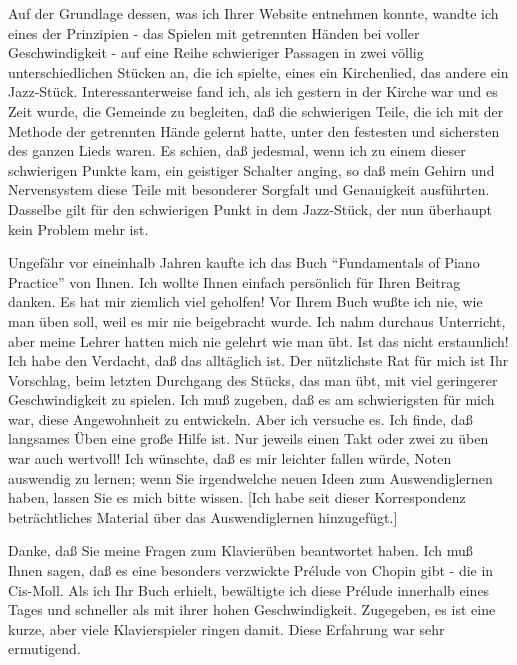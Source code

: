 \item \label{testimonials12}
Auf der Grundlage dessen, was ich Ihrer Website entnehmen konnte, wandte ich eines der Prinzipien - das Spielen mit getrennten Händen bei voller Geschwindigkeit - auf eine Reihe schwieriger Passagen in zwei völlig unterschiedlichen Stücken an, die ich spielte, eines ein Kirchenlied, das andere ein Jazz-Stück.
Interessanterweise fand ich, als ich gestern in der Kirche war und es Zeit wurde, die Gemeinde zu begleiten, daß die schwierigen Teile, die ich mit der Methode der getrennten Hände gelernt hatte, unter den festesten und sichersten des ganzen Lieds waren.
Es schien, daß jedesmal, wenn ich zu einem dieser schwierigen Punkte kam, ein geistiger Schalter anging, so daß mein Gehirn und Nervensystem diese Teile mit besonderer Sorgfalt und Genauigkeit ausführten.
Dasselbe gilt für den schwierigen Punkt in dem Jazz-Stück, der nun überhaupt kein Problem mehr ist.


\item \label{testimonials13}
Ungefähr vor eineinhalb Jahren kaufte ich das Buch \enquote{Fundamentals of Piano Practice} von Ihnen.
Ich wollte Ihnen einfach persönlich für Ihren Beitrag danken.
Es hat mir ziemlich viel geholfen!
Vor Ihrem Buch wußte ich nie, wie man üben soll, weil es mir nie beigebracht wurde.
Ich nahm durchaus Unterricht, aber meine Lehrer hatten mich nie gelehrt wie man übt.
Ist das nicht erstaunlich!
Ich habe den Verdacht, daß das alltäglich ist.
Der nützlichste Rat für mich ist Ihr Vorschlag, beim letzten Durchgang des Stücks, das man übt, mit viel geringerer Geschwindigkeit zu spielen.
Ich muß zugeben, daß es am schwierigsten für mich war, diese Angewohnheit zu entwickeln.
Aber ich versuche es.
Ich finde, daß langsames Üben eine große Hilfe ist.
Nur jeweils einen Takt oder zwei zu üben war auch wertvoll!
Ich wünschte, daß es mir leichter fallen würde, Noten auswendig zu lernen; wenn Sie irgendwelche neuen Ideen zum Auswendiglernen haben, lassen Sie es mich bitte wissen.
[Ich habe seit dieser Korrespondenz beträchtliches Material über das Auswendiglernen hinzugefügt.]


\item \label{testimonials14}
Danke, daß Sie meine Fragen zum Klavierüben beantwortet haben.
Ich muß Ihnen sagen, daß es eine besonders verzwickte Prélude von Chopin gibt - die in Cis-Moll.
Als ich Ihr Buch erhielt, bewältigte ich diese Prélude innerhalb eines Tages und schneller als mit ihrer hohen Geschwindigkeit.
Zugegeben, es ist eine kurze, aber viele Klavierspieler ringen damit.
Diese Erfahrung war sehr ermutigend.


